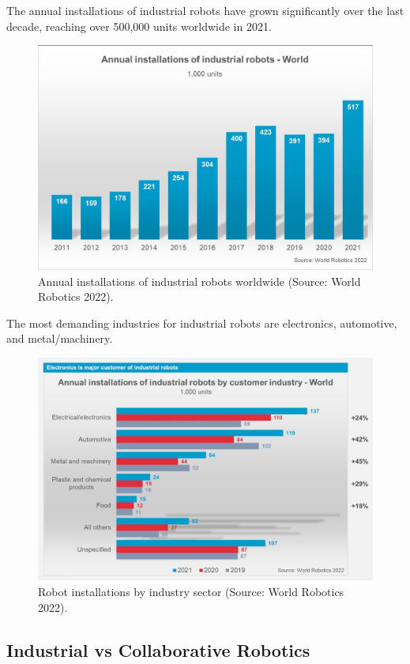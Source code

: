 The annual installations of industrial robots have grown significantly over the last decade, reaching over 500,000 units worldwide in 2021.

\begin{figure}[H]
  \centering
  \includegraphics[width=0.85\linewidth]{imgs/industrial_robotics_world_installations.png}
  \caption{Annual installations of industrial robots worldwide (Source: World Robotics 2022).}
\end{figure}

The most demanding industries for industrial robots are electronics, automotive, and metal/machinery.

\begin{figure}[H]
  \centering
  \includegraphics[width=0.85\linewidth]{imgs/industrial_robotics_by_industry.png}
  \caption{Robot installations by industry sector (Source: World Robotics 2022).}
\end{figure}

\hfill

\subsection{Industrial vs Collaborative Robotics}

